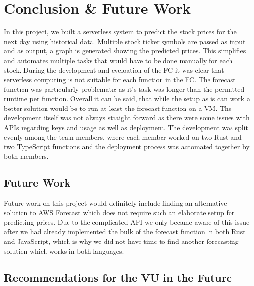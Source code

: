 \chapter{\label{chap:conclusion}Conclusion \& Future Work}

In this project, we built a serverless system to predict the stock prices for
the next day using historical data. Multiple stock ticker symbols are passed as
input and as output, a graph is generated showing the predicted prices. This
simplifies and automates multiple tasks that would have to be done manually for
each stock. During the development and eveloation of the FC it was clear that
serverless computing is not suitable for each function in the FC. The forecast
function was particularly problematic as it's task was longer than the
permitted runtime per function. Overall it can be said, that while the setup as
is can work a better solution would be to run at least the forecast function on
a VM. The development itself was not always straight forward as there were some
issues with APIs regarding keys and usage as well as deployment. The
development was split evenly among the team members, where each member worked
on two Rust and two TypeScript functions and the deployment process was
automated together by both members.




%
%
%
\section{Future Work}

Future work on this project would definitely include finding an alternative
solution to AWS Forecast which does not require such an elaborate setup for
predicting prices.  Due to the complicated API we only became aware of this
issue after we had already implemented the bulk of the forecast function in
both Rust and JavaScript, which is why we did not have time to find another
forecasting solution which works in both languages.



%
%
%
\section{Recommendations for the VU in the Future}

